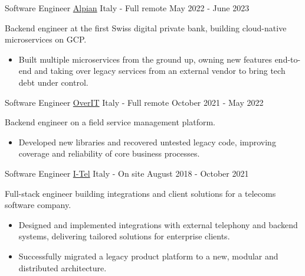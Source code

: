 \begin{cventries}
	
\cventry
	{Software Engineer} %
	{\href{https://alpian.com/}{Alpian}} %
	{Italy - Full remote} %
	{May 2022 - June 2023} %
	{
		Backend engineer at the first Swiss digital private bank, building cloud-native microservices on GCP.
		\begin{itemize}
			\item {Built multiple microservices from the ground up, owning new features end-to-end and taking over legacy services from an external vendor to bring tech debt under control.}
		\end{itemize}
	}


\cventry
	{Software Engineer} %
	{\href{https://overit.it/en}{OverIT}} %
	{Italy - Full remote} %
	{October 2021 - May 2022} %
	{
		Backend engineer on a field service management platform.
		\begin{itemize}
			\item {Developed new libraries and recovered untested legacy code, improving coverage and reliability of core business processes.}
		\end{itemize}
	}


\cventry
    {Software Engineer} %
    {\href{https://i-tel.it}{I-Tel}} %
    {Italy - On site} %
    {August 2018 - October 2021} %
    {
		Full-stack engineer building integrations and client solutions for a telecoms software company.
      	\begin{itemize}
      		\item {Designed and implemented integrations with external telephony and backend systems, delivering tailored solutions for enterprise clients.}
      		\item {Successfully migrated a legacy product platform to a new, modular and distributed architecture.}
      	\end{itemize}
    }


\end{cventries}
